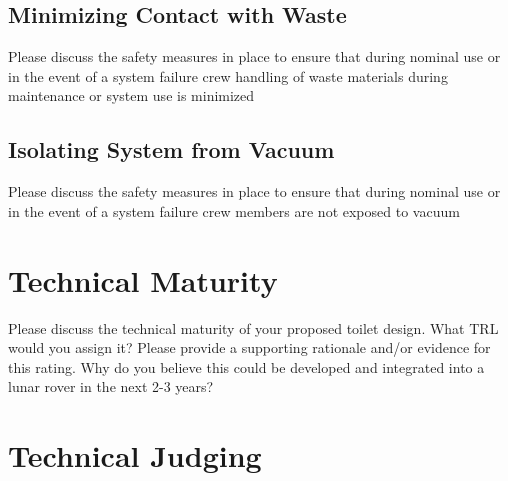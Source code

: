     \subsection{Minimizing Contact with Waste}
    Please discuss the safety measures in place to ensure that during nominal use or in the event of a system failure crew handling of waste materials during maintenance or system use is minimized

    \subsection{Isolating System from Vacuum}
    Please discuss the safety measures in place to ensure that during nominal use or in the event of a system failure crew members are not exposed to vacuum

\pagebreak
\section{Technical Maturity}
    Please discuss the technical maturity of your proposed toilet design. What TRL would you assign it? Please provide a supporting rationale and/or evidence for this rating. Why do you believe this could be developed and integrated into a lunar rover in the next 2-3 years?

\pagebreak
\section{Technical Judging}

